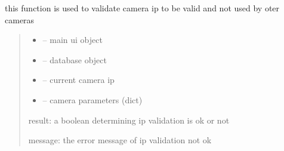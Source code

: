 \documentclass[letterpaper,10pt,english]{sphinxmanual}
\begin{document}
\begin{savenotes}\begin{fulllineitems}
\label{\detokenize{setting/backend/camera_funcs:oxin.backend.camera_funcs.validate_camera_ip}}
\pysigstartsignatures
{}
\pysigstopsignatures
\sphinxAtStartPar
this function is used to validate camera ip to be valid and not used by oter cameras
\begin{quote}\begin{description}
\begin{itemize}
\item {} 
\sphinxAtStartPar
{} – main ui object

\item {} 
\sphinxAtStartPar
{} – database object

\item {} 
\sphinxAtStartPar
{} – current camera ip

\item {} 
\sphinxAtStartPar
{} – camera parameters (dict)

\end{itemize}

\sphinxAtStartPar
result: a boolean determining ip validation is ok or not

\sphinxAtStartPar
message: the error message of ip validation not ok

\end{description}\end{quote}

\end{fulllineitems}\end{savenotes}

\end{document}
